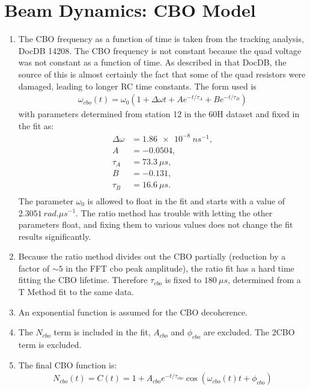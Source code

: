 \section{Beam Dynamics: CBO Model}

	\begin{enumerate}
		\item{The CBO frequency as a function of time is taken from the tracking analysis, DocDB 14208. The CBO frequency is not constant because the quad voltage was not constant as a function of time. As described in that DocDB, the source of this is almost certainly the fact that some of the quad resistors were damaged, leading to longer RC time constants. The form used is 
			\begin{gather}
				\omega_{cbo}(t) = \omega_{0}(1 + \Delta\omega t + A e^{-t/\tau_{A}} + B e^{-t/\tau_{B}})
			\end{gather}
		with parameters determined from station 12 in the 60H dataset and fixed in the fit as:
			\begin{equation*}	
			\begin{aligned}
			 	\Delta\omega &= \SI{1.86e-8}{ns^{-1}}, \\
			 	A &= -0.0504, \\
			 	\tau_{A} &= \SI{73.3}{\mu s}, \\
			 	B &= -0.131, \\
			 	\tau_{B} &= \SI{16.6}{\mu s}. \\
			\end{aligned}
			\end{equation*}
		The parameter $\omega_{0}$ is allowed to float in the fit and starts with a value of $\SI{2.3051}{rad.\mu s^{-1}}$. The ratio method has trouble with letting the other parameters float, and fixing them to various values does not change the fit results significantly.}
		\item{Because the ratio method divides out the CBO partially (reduction by a factor of $\sim5$ in the FFT cbo peak amplitude), the ratio fit has a hard time fitting the CBO lifetime. Therefore $\tau_{cbo}$ is fixed to $\SI{180}{\mu s}$, determined from a T Method fit to the same data.}
		\item{An exponential function is assumed for the CBO decoherence.}
		\item{The $N_{cbo}$ term is included in the fit, $A_{cbo}$ and $\phi_{cbo}$ are excluded. The 2CBO term is excluded.}
		\item{The final CBO function is:
			\begin{gather}
					N_{cbo}(t) = C(t) = 1 + A_{cbo} e^{-t/\tau_{cbo}} \cos(\omega_{cbo}(t)t + \phi_{cbo})
			\label{eqn:CBO}
			\end{gather}
		}
	\end{enumerate}


